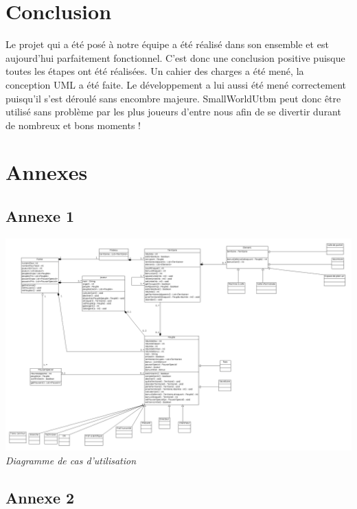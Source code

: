 \documentclass[a4paper, 11pt]{article}
\begin{document}
		
	\section*{Conclusion}
	
	Le projet qui a été posé à notre équipe a été réalisé dans son ensemble et est aujourd'hui parfaitement fonctionnel. C'est donc une conclusion positive puisque toutes les étapes ont été réalisées. Un cahier des charges a été mené, la conception UML a été faite. Le développement a lui aussi été mené correctement puisqu'il s'est déroulé sans encombre majeure. SmallWorldUtbm peut donc être utilisé sans problème par les plus joueurs d'entre nous afin de se divertir durant de nombreux et bons moments !
		
		
	\newpage	
	\section*{Annexes}
	
		\subsection*{Annexe 1}
		
		\begin{center}
			\vspace*{3cm}
			\includegraphics[width=18cm]{DiagrammeDeCasDUtilisation.png}\\
			\emph{Diagramme de cas d'utilisation}		
		\end{center}
		
		\newpage
		
		
		\subsection*{Annexe 2}
		
\end{document}
